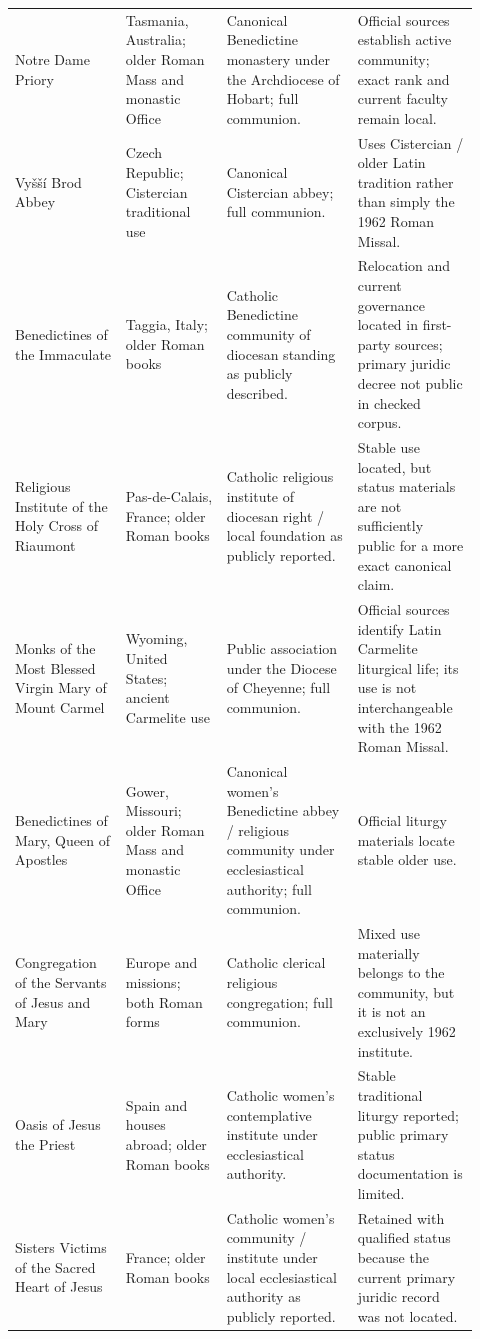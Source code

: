 \begin{longtable}{>{\bfseries\raggedright\arraybackslash}p{0.22\linewidth}>{\raggedright\arraybackslash}p{0.20\linewidth}>{\raggedright\arraybackslash}p{0.26\linewidth}>{\raggedright\arraybackslash}p{0.24\linewidth}}
Notre Dame Priory & Tasmania, Australia; older Roman Mass and monastic Office & Canonical Benedictine monastery under the Archdiocese of Hobart; full communion. & Official sources establish active community; exact rank and current faculty remain local.\\
Vyšší Brod Abbey & Czech Republic; Cistercian traditional use & Canonical Cistercian abbey; full communion. & Uses Cistercian / older Latin tradition rather than simply the 1962 Roman Missal.\\
Benedictines of the Immaculate & Taggia, Italy; older Roman books & Catholic Benedictine community of diocesan standing as publicly described. & Relocation and current governance located in first-party sources; primary juridic decree not public in checked corpus.\\
Religious Institute of the Holy Cross of Riaumont & Pas-de-Calais, France; older Roman books & Catholic religious institute of diocesan right / local foundation as publicly reported. & Stable use located, but status materials are not sufficiently public for a more exact canonical claim.\\
Monks of the Most Blessed Virgin Mary of Mount Carmel & Wyoming, United States; ancient Carmelite use & Public association under the Diocese of Cheyenne; full communion. & Official sources identify Latin Carmelite liturgical life; its use is not interchangeable with the 1962 Roman Missal.\\
Benedictines of Mary, Queen of Apostles & Gower, Missouri; older Roman Mass and monastic Office & Canonical women's Benedictine abbey / religious community under ecclesiastical authority; full communion. & Official liturgy materials locate stable older use.\\
Congregation of the Servants of Jesus and Mary & Europe and missions; both Roman forms & Catholic clerical religious congregation; full communion. & Mixed use materially belongs to the community, but it is not an exclusively 1962 institute.\\
Oasis of Jesus the Priest & Spain and houses abroad; older Roman books & Catholic women's contemplative institute under ecclesiastical authority. & Stable traditional liturgy reported; public primary status documentation is limited.\\
Sisters Victims of the Sacred Heart of Jesus & France; older Roman books & Catholic women's community / institute under local ecclesiastical authority as publicly reported. & Retained with qualified status because the current primary juridic record was not located.\\

\end{longtable}
